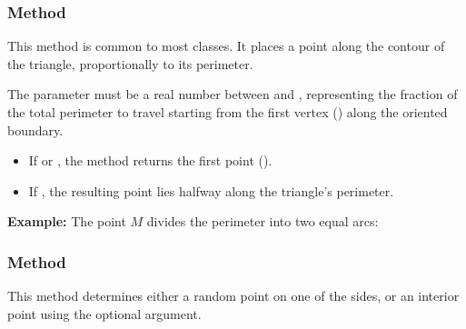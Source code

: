 \subsubsection{Method }
\label{ssub:method_triangle_point_r}

This method is common to most classes. It places a point along the contour of the triangle, proportionally to its perimeter.

\medskip
\noindent
The parameter  must be a real number between  and , representing the fraction of the total perimeter to travel starting from the first vertex () along the oriented boundary.

\begin{itemize}
  \item If  or , the method returns the first point ().
  \item If , the resulting point lies halfway along the triangle’s perimeter.
\end{itemize}

\medskip
\noindent
\textbf{Example:} The point $M$ divides the perimeter into two equal arcs:
\begin{center}
\end{center}

\vspace{1em}


\begin{tkzexample}[latex=.5\textwidth]
\end{tkzexample}

\subsubsection{Method }
\label{ssub:method_triangle_random_inside}

This method determines either a random point on one of the sides, or an interior point using the optional  argument.

\begin{tkzexample}[latex=.5\textwidth]
\end{tkzexample}

